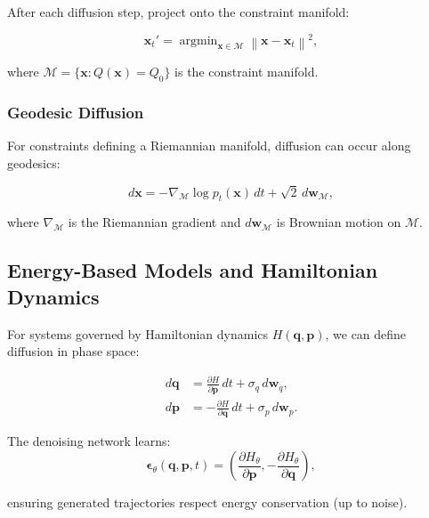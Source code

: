 \documentclass[12pt]{report}
\theoremstyle{definition}
\newcommand{\norm}[1]{\left\| #1 \right\|}
\begin{document}
After each diffusion step, project onto the constraint manifold:

\begin{equation}
\mathbf{x}_t' = \mathop{\arg\min}_{\mathbf{x} \in \mathcal{M}} \norm{\mathbf{x} - \mathbf{x}_t}^2,
\label{eq:projection}
\end{equation}

where $\mathcal{M} = \{\mathbf{x} : Q(\mathbf{x}) = Q_0\}$ is the constraint manifold.

\subsubsection{Geodesic Diffusion}

For constraints defining a Riemannian manifold, diffusion can occur along geodesics:

\begin{equation}
d\mathbf{x} = -\nabla_{\mathcal{M}} \log p_t(\mathbf{x}) \, dt + \sqrt{2} \, d\mathbf{w}_{\mathcal{M}},
\label{eq:geodesic_diffusion}
\end{equation}

where $\nabla_{\mathcal{M}}$ is the Riemannian gradient and $d\mathbf{w}_{\mathcal{M}}$ is Brownian motion on $\mathcal{M}$.

\subsection{Energy-Based Models and Hamiltonian Dynamics}

For systems governed by Hamiltonian dynamics $H(\mathbf{q}, \mathbf{p})$, we can define diffusion in phase space:

\begin{align}
d\mathbf{q} &= \frac{\partial H}{\partial \mathbf{p}} \, dt + \sigma_q \, d\mathbf{w}_q, \label{eq:hamiltonian_q} \\
d\mathbf{p} &= -\frac{\partial H}{\partial \mathbf{q}} \, dt + \sigma_p \, d\mathbf{w}_p. \label{eq:hamiltonian_p}
\end{align}

The denoising network learns:
\begin{equation}
\boldsymbol{\epsilon}_\theta(\mathbf{q}, \mathbf{p}, t) = \left(\frac{\partial H_\theta}{\partial \mathbf{p}}, -\frac{\partial H_\theta}{\partial \mathbf{q}}\right),
\label{eq:hamiltonian_score}
\end{equation}

ensuring generated trajectories respect energy conservation (up to noise).
\end{document}
